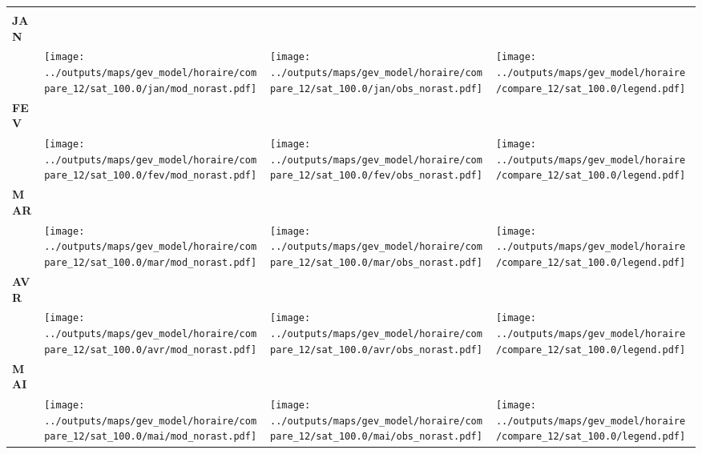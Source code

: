 \documentclass[
  letterpaper,
  DIV=11,
  numbers=noendperiod]{scrartcl}
\begin{document}
\begin{longtable*}{m{2.0cm}m{7.9cm}m{7.9cm}m{1cm}}
 & \centering  & \centering  & \tabularnewline
\centering \textbf{JAN} \\[0.2em] \begin{tabular}{r@{\hspace{0.2em}}l}\end{tabular} & \centering \texttt{[image: ../outputs/maps/gev\_model/horaire/compare\_12/sat\_100.0/jan/mod\_norast.pdf]} & \centering \texttt{[image: ../outputs/maps/gev\_model/horaire/compare\_12/sat\_100.0/jan/obs\_norast.pdf]} & \centering \texttt{[image: ../outputs/maps/gev\_model/horaire/compare\_12/sat\_100.0/legend.pdf]} \tabularnewline
\centering \textbf{FEV} \\[0.2em] \begin{tabular}{r@{\hspace{0.2em}}l}\end{tabular} & \centering \texttt{[image: ../outputs/maps/gev\_model/horaire/compare\_12/sat\_100.0/fev/mod\_norast.pdf]} & \centering \texttt{[image: ../outputs/maps/gev\_model/horaire/compare\_12/sat\_100.0/fev/obs\_norast.pdf]} & \centering \texttt{[image: ../outputs/maps/gev\_model/horaire/compare\_12/sat\_100.0/legend.pdf]} \tabularnewline
\centering \textbf{MAR} \\[0.2em] \begin{tabular}{r@{\hspace{0.2em}}l}\end{tabular} & \centering \texttt{[image: ../outputs/maps/gev\_model/horaire/compare\_12/sat\_100.0/mar/mod\_norast.pdf]} & \centering \texttt{[image: ../outputs/maps/gev\_model/horaire/compare\_12/sat\_100.0/mar/obs\_norast.pdf]} & \centering \texttt{[image: ../outputs/maps/gev\_model/horaire/compare\_12/sat\_100.0/legend.pdf]} \tabularnewline
\centering \textbf{AVR} \\[0.2em] \begin{tabular}{r@{\hspace{0.2em}}l}\end{tabular} & \centering \texttt{[image: ../outputs/maps/gev\_model/horaire/compare\_12/sat\_100.0/avr/mod\_norast.pdf]} & \centering \texttt{[image: ../outputs/maps/gev\_model/horaire/compare\_12/sat\_100.0/avr/obs\_norast.pdf]} & \centering \texttt{[image: ../outputs/maps/gev\_model/horaire/compare\_12/sat\_100.0/legend.pdf]} \tabularnewline
\centering \textbf{MAI} \\[0.2em] \begin{tabular}{r@{\hspace{0.2em}}l}\end{tabular} & \centering \texttt{[image: ../outputs/maps/gev\_model/horaire/compare\_12/sat\_100.0/mai/mod\_norast.pdf]} & \centering \texttt{[image: ../outputs/maps/gev\_model/horaire/compare\_12/sat\_100.0/mai/obs\_norast.pdf]} & \centering \texttt{[image: ../outputs/maps/gev\_model/horaire/compare\_12/sat\_100.0/legend.pdf]} \tabularnewline

\end{longtable*}
\end{document}
